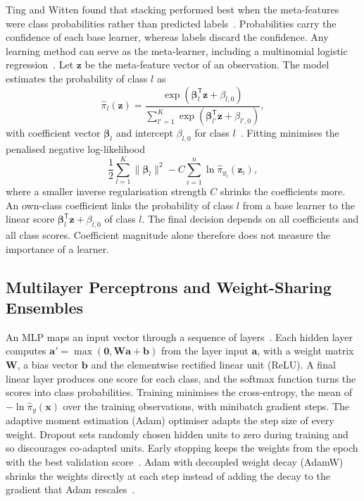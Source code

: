 \documentclass[conference]{IEEEtran}
\begin{document}
Ting and Witten found that stacking performed best when the meta-features were class probabilities rather than predicted labels~\cite{ting1999}. Probabilities carry the confidence of each base learner, whereas labels discard the confidence. Any learning method can serve as the meta-learner, including a multinomial logistic regression~\cite{hastie2009}. Let $\mathbf{z}$ be the meta-feature vector of an observation. The model estimates the probability of class $l$ as
\begin{equation}
    \hat{\pi}_l(\mathbf{z}) = \frac{\exp(\bm{\beta}_l^{\mathsf T}\mathbf{z} + \beta_{l,0})}{\sum_{l'=1}^{K}\exp(\bm{\beta}_{l'}^{\mathsf T}\mathbf{z} + \beta_{l',0})},
\end{equation}
with coefficient vector $\bm{\beta}_l$ and intercept $\beta_{l,0}$ for class $l$~\cite{hastie2009}. Fitting minimises the penalised negative log-likelihood
\begin{equation}
    \frac{1}{2}\sum_{l=1}^{K}\|\bm{\beta}_l\|^2 - C\sum_{i=1}^{n} \ln\hat{\pi}_{y_i}(\mathbf{z}_i),
\end{equation}
where a smaller inverse regularisation strength $C$ shrinks the coefficients more. An own-class coefficient links the probability of class $l$ from a base learner to the linear score $\bm{\beta}_l^{\mathsf T}\mathbf{z} + \beta_{l,0}$ of class $l$. The final decision depends on all coefficients and all class scores. Coefficient magnitude alone therefore does not measure the importance of a learner.

\subsection{Multilayer Perceptrons and Weight-Sharing Ensembles}
An MLP maps an input vector through a sequence of layers~\cite{goodfellow2016}. Each hidden layer computes $\mathbf{a}' = \max(\mathbf{0}, \mathbf{W}\mathbf{a} + \mathbf{b})$ from the layer input $\mathbf{a}$, with a weight matrix $\mathbf{W}$, a bias vector $\mathbf{b}$ and the elementwise rectified linear unit (ReLU). A final linear layer produces one score for each class, and the softmax function turns the scores into class probabilities. Training minimises the cross-entropy, the mean of $-\ln\hat{\pi}_{y}(\mathbf{x})$ over the training observations, with minibatch gradient steps. The adaptive moment estimation (Adam) optimiser adapts the step size of every weight. Dropout sets randomly chosen hidden units to zero during training and so discourages co-adapted units. Early stopping keeps the weights from the epoch with the best validation score~\cite{goodfellow2016}. Adam with decoupled weight decay (AdamW) shrinks the weights directly at each step instead of adding the decay to the gradient that Adam rescales~\cite{loshchilov2019}.
\end{document}
